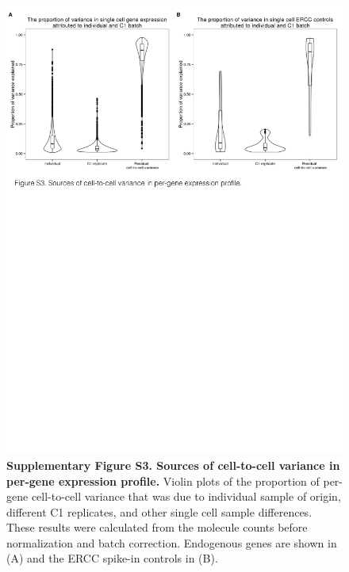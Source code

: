 \begin{figure}[htbp]
\centering
\includegraphics[width=5in]{img/ch04/Figure08.jpeg}
\caption{\textbf{Supplementary Figure S3. Sources of cell-to-cell
variance in per-gene expression profile.} Violin plots of the proportion
of per-gene cell-to-cell variance that was due to individual sample of
origin, different C1 replicates, and other single cell sample
differences. These results were calculated from the molecule counts
before normalization and batch correction. Endogenous genes are shown in
(A) and the ERCC spike-in controls in (B).}
\end{figure}

